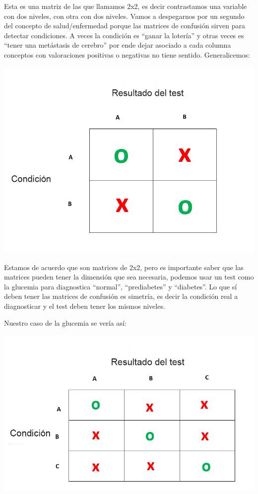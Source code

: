 \documentclass[
]{book}
\begin{document}
Esta es una matriz de las que llamamos 2x2, es decir contrastamos una variable con dos niveles, con otra con dos niveles. Vamos a despegarnos por un segundo del concepto de salud/enfermedad porque las matrices de confusión sirven para detectar condiciones.
A veces la condición es ``ganar la lotería'' y otras veces es ``tener una metástasis de cerebro'' por ende dejar asociado a cada columna conceptos con valoraciones positivas o negativas no tiene sentido. Generalicemos:

\includegraphics[width=11.6in]{img/matrix2}

Estamos de acuerdo que son matrices de 2x2, pero es importante saber que las matrices pueden tener la dimensión que sea necesaria, podemos usar un test como la glucemia para diagnostica ``normal'', ``prediabetes'' y ``diabetes''. Lo que sí deben tener las matrices de confusión es simetría, es decir la condición real a diagnosticar y el test deben tener los mismos niveles.

Nuestro caso de la glucemia se vería así:

\includegraphics[width=11.38in]{img/matrix3}
\end{document}

